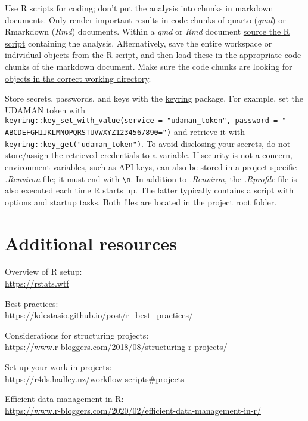 \documentclass[
  letterpaper,
  DIV=11,
  numbers=noendperiod]{scrreport}
\begin{document}
Use R scripts for coding; don't put the analysis into chunks in markdown
documents. Only render important results in code chunks of quarto
(\emph{qmd}) or Rmarkdown (\emph{Rmd}) documents. Within a \emph{qmd} or
\emph{Rmd} document
\href{https://bookdown.org/yihui/rmarkdown-cookbook/source-script.html}{source
the R script} containing the analysis. Alternatively, save the entire
workspace or individual objects from the R script, and then load these
in the appropriate code chunks of the markdown document. Make sure the
code chunks are looking for
\href{https://bookdown.org/yihui/rmarkdown-cookbook/working-directory.html}{objects
in the correct working directory}.

Store secrets, passwords, and keys with the
\href{https://keyring.r-lib.org/index.html}{keyring} package. For
example, set the UDAMAN token with
\texttt{keyring::key\_set\_with\_value(service\ =\ "udaman\_token",\ password\ =\ "-ABCDEFGHIJKLMNOPQRSTUVWXYZ1234567890=")}
and retrieve it with \texttt{keyring::key\_get("udaman\_token")}. To
avoid disclosing your secrets, do not store/assign the retrieved
credentials to a variable. If security is not a concern, environment
variables, such as API keys, can also be stored in a project specific
\emph{.Renviron} file; it must end with \texttt{\textbackslash{}n}. In
addition to \emph{.Renviron}, the \emph{.Rprofile} file is also executed
each time R starts up. The latter typically contains a script with
options and startup tasks. Both files are located in the project root
folder.

\section{Additional resources}\label{additional-resources}

Overview of R setup:\\
\url{https://rstats.wtf}

Best practices:\\
\url{https://kdestasio.github.io/post/r_best_practices/}

Considerations for structuring projects:\\
\url{https://www.r-bloggers.com/2018/08/structuring-r-projects/}

Set up your work in projects:\\
\url{https://r4ds.hadley.nz/workflow-scripts\#projects}

Efficient data management in R:\\
\url{https://www.r-bloggers.com/2020/02/efficient-data-management-in-r/}
\end{document}
